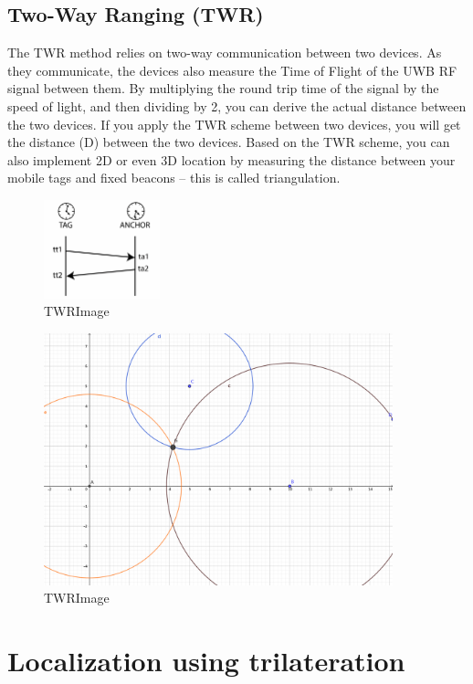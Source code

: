 \documentclass[\main/main.tex]{subfiles}
\begin{document}
\subsection{Two-Way Ranging (TWR)}
The TWR method relies on two-way communication between two devices. As they communicate, the devices also measure the Time of Flight of the UWB RF signal between them. By multiplying the round trip time of the signal by the speed of light, and then dividing by 2, you can derive the actual distance between the two devices. If you apply the TWR scheme between two devices, you will get the distance (D) between the two devices. Based on the TWR scheme, you can also implement 2D or even 3D location by measuring the distance between your mobile tags and fixed beacons – this is called triangulation.

\begin{figure}[H]
    \centering
    \includegraphics[width=0.3\textwidth]{twr_protocol.png}
    \caption{TWRImage}
    \label{fig:TWRImage}
\end{figure}

\begin{figure}[H]
    \centering
    \includegraphics[width=0.9\textwidth]{twr.png}
    \caption{TWRImage}
    \label{fig:TWRImage}
\end{figure}

\section{Localization using trilateration}
\label{sec:localization_using_trilateration}
\end{document}
